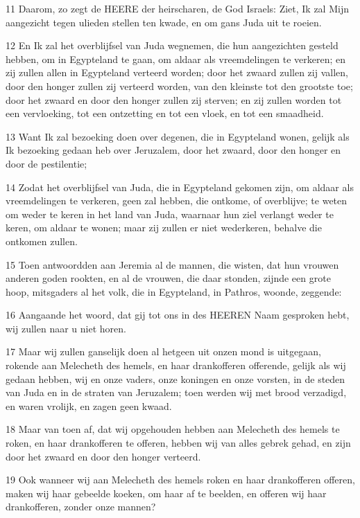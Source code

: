 \par 11 Daarom, zo zegt de HEERE der heirscharen, de God Israels: Ziet, Ik zal Mijn aangezicht tegen ulieden stellen ten kwade, en om gans Juda uit te roeien.
\par 12 En Ik zal het overblijfsel van Juda wegnemen, die hun aangezichten gesteld hebben, om in Egypteland te gaan, om aldaar als vreemdelingen te verkeren; en zij zullen allen in Egypteland verteerd worden; door het zwaard zullen zij vallen, door den honger zullen zij verteerd worden, van den kleinste tot den grootste toe; door het zwaard en door den honger zullen zij sterven; en zij zullen worden tot een vervloeking, tot een ontzetting en tot een vloek, en tot een smaadheid.
\par 13 Want Ik zal bezoeking doen over degenen, die in Egypteland wonen, gelijk als Ik bezoeking gedaan heb over Jeruzalem, door het zwaard, door den honger en door de pestilentie;
\par 14 Zodat het overblijfsel van Juda, die in Egypteland gekomen zijn, om aldaar als vreemdelingen te verkeren, geen zal hebben, die ontkome, of overblijve; te weten om weder te keren in het land van Juda, waarnaar hun ziel verlangt weder te keren, om aldaar te wonen; maar zij zullen er niet wederkeren, behalve die ontkomen zullen.
\par 15 Toen antwoordden aan Jeremia al de mannen, die wisten, dat hun vrouwen anderen goden rookten, en al de vrouwen, die daar stonden, zijnde een grote hoop, mitsgaders al het volk, die in Egypteland, in Pathros, woonde, zeggende:
\par 16 Aangaande het woord, dat gij tot ons in des HEEREN Naam gesproken hebt, wij zullen naar u niet horen.
\par 17 Maar wij zullen ganselijk doen al hetgeen uit onzen mond is uitgegaan, rokende aan Melecheth des hemels, en haar drankofferen offerende, gelijk als wij gedaan hebben, wij en onze vaders, onze koningen en onze vorsten, in de steden van Juda en in de straten van Jeruzalem; toen werden wij met brood verzadigd, en waren vrolijk, en zagen geen kwaad.
\par 18 Maar van toen af, dat wij opgehouden hebben aan Melecheth des hemels te roken, en haar drankofferen te offeren, hebben wij van alles gebrek gehad, en zijn door het zwaard en door den honger verteerd.
\par 19 Ook wanneer wij aan Melecheth des hemels roken en haar drankofferen offeren, maken wij haar gebeelde koeken, om haar af te beelden, en offeren wij haar drankofferen, zonder onze mannen?
